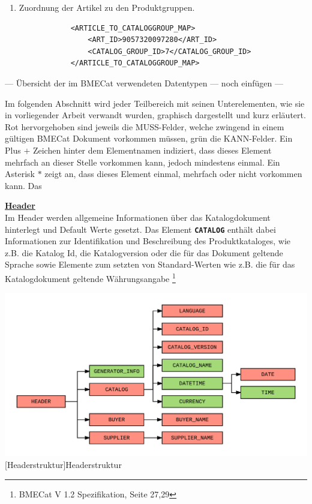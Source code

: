 \begin{enumerate}
	
			\item Zuordnung der Artikel zu den Produktgruppen.
			\begin{lstlisting}
			<ARTICLE_TO_CATALOGGROUP_MAP>
				<ART_ID>9057320097280</ART_ID>
				<CATALOG_GROUP_ID>7</CATALOG_GROUP_ID>
			</ARTICLE_TO_CATALOGGROUP_MAP>
			\end{lstlisting}
		
		\end{enumerate}
		
	--- Übersicht der im BMECat verwendeten Datentypen --- noch einfügen ---
	
	Im folgenden Abschnitt wird jeder Teilbereich mit seinen Unterelementen, wie sie in vorliegender Arbeit verwandt wurden, graphisch dargestellt und kurz erläutert. Rot hervorgehoben sind jeweils die MUSS-Felder, welche zwingend in einem gültigen BMECat Dokument vorkommen müssen, grün die KANN-Felder. Ein Plus \(+\) Zeichen hinter dem Elementnamen indiziert, dass dieses Element mehrfach an dieser Stelle vorkommen kann, jedoch mindestens einmal. Ein Asterisk \(*\) zeigt an, dass dieses Element einmal, mehrfach oder nicht vorkommen kann. Das 
	
	\textbf{\underline{Header}}\\
	Im Header werden allgemeine Informationen über das Katalogdokument hinterlegt und Default Werte gesetzt. Das Element \texttt{\textbf{CATALOG}} enthält dabei Informationen zur Identifikation und Beschreibung des Produktkataloges, wie z.B. die Katalog Id, die Katalogversion oder die für das Dokument geltende Sprache sowie Elemente zum setzten von Standard-Werten wie z.B. die für das Katalogdokument geltende Währungsangabe \footnote{BMECat V 1.2 Spezifikation, Seite 27,29} 
	
	\begin{minipage}{\linewidth}
		\vspace{1em}
		\centering
		\includegraphics[width=1\linewidth]{img/BMECat_Header}
		[Headerstruktur]{Headerstruktur}
		\label{fig:header}
		\vspace{1em}
	\end{minipage}
	
